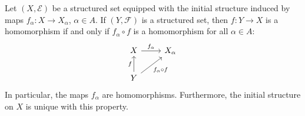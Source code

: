 \documentclass[article, a4paper, 11pt, oneside]{memoir}
\numberwithin{equation}{chapter}
\newcommand{\calE}{\mathcal{E}}
\newcommand{\calF}{\mathcal{F}}
\begin{document}
\begin{theorem}
    Let $(X,\calE)$ be a structured set equipped with the initial structure induced by maps $f_\alpha \colon X \to X_\alpha$,  $\alpha \in A$. If $(Y,\calF)$ is a structured set, then $f \colon Y \to X$ is a homomorphism if and only if $f_\alpha \circ f$ is a homomorphism for all $\alpha \in A$:
    \begin{equation*}
        \begin{tikzcd}
            X
                \ar[r, "f_\alpha"]
            & X_\alpha \\
            Y
                \ar[u, "f"]
                \ar[ur, "f_\alpha \circ f", swap]
        \end{tikzcd}
    \end{equation*}
    In particular, the maps $f_\alpha$ are homomorphisms. Furthermore, the initial structure on $X$ is unique with this property.
\end{theorem}
\end{document}

